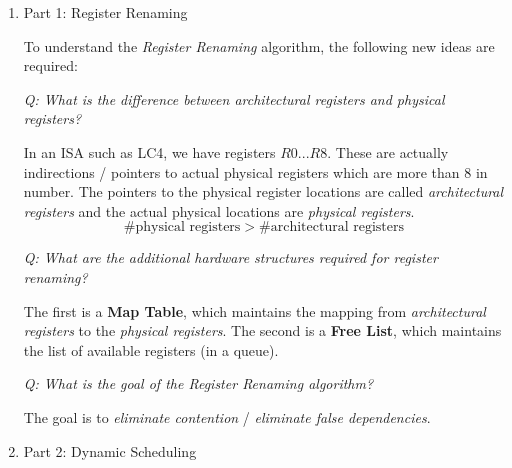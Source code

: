\documentclass[12pt]{article}
\newenvironment{QandA}{\begin{enumerate}[label=\bfseries\arabic*.]\bfseries}
                      {\end{enumerate}}
\newenvironment{answered}{\par\quad\normalfont}{}
\begin{document}
\begin{QandA}
\item Part 1: Register Renaming
\begin{answered}
To understand the \textit{Register Renaming} algorithm, the following new ideas are required:

\textit{Q: What is the difference between architectural registers and physical registers?}

\quad In an ISA such as LC4, we have registers $R0...R8$. These are actually indirections / pointers to actual physical registers which are more than 8 in number. The pointers to the physical register locations are called \textit{architectural registers} and the actual physical locations are \textit{physical registers}.
\begin{equation*}
    \#\text{physical registers} > \#\text{architectural registers}
\end{equation*}

\textit{Q: What are the additional hardware structures required for register renaming?}

\quad The first is a \textbf{Map Table}, which maintains the mapping from \textit{architectural registers} to the \textit{physical registers}. The second is a \textbf{Free List}, which maintains the list of available registers (in a queue). 

\textit{Q: What is the goal of the Register Renaming algorithm?}

\quad The goal is to \textit{eliminate contention} / \textit{eliminate false dependencies}. 
\end{answered}

\item Part 2: Dynamic Scheduling
\begin{answered}

\end{answered}


\end{QandA}
\end{document}
